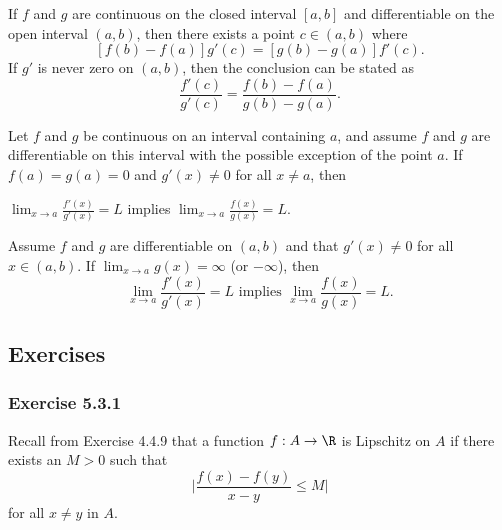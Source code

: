 \begin{tcolorbox}
    \begin{thm}
    If \( f  \) and \( g  \) are continuous on the closed interval \( [a,b]  \) and differentiable on the open interval \( (a,b)  \), then there exists a point \( c \in (a,b)  \) where 
    \[  [f(b) -f(a)]g'(c) = [g(b) -g(a)]f'(c). \]
    If \( g'  \) is never zero on \( (a,b)  \), then the conclusion can be stated as 
    \[  \frac{ f'(c)  }{ g'(c)  } = \frac{ f(b) - f(a)  }{ g(b) - g(a)  }. \]
    \end{thm}
\end{tcolorbox}

\begin{tcolorbox}
    \begin{thm}
    Let \( f  \) and \( g  \) be continuous on an interval containing \( a  \), and assume \( f  \) and \( g  \) are differentiable on this interval with the possible exception of the point \( a  \). If \( f(a) = g(a) = 0  \) and \( g'(x) \neq 0  \) for all \( x \neq a  \), then 
    \begin{center}
        \( \lim_{ x \to a } \frac{ f'(x)  }{ g'(x)  } = L  \) implies \( \lim_{ x \to a } \frac{ f(x)  }{ g(x)  } = L. \)
    \end{center}
    \end{thm}
\end{tcolorbox}

\begin{tcolorbox}
    \begin{thm}
    Assume \( f  \) and \( g  \) are differentiable on \( (a,b)  \) and that \( g'(x) \neq 0  \) for all \( x \in (a,b) \). If \( \lim_{ x \to a } g(x) = \infty  \) (or \( - \infty  \)), then 
    \[  \lim_{ x \to a } \frac{ f'(x)  }{ g'(x)  } = L \text{~implies~} \lim_{ x \to a } \frac{ f(x)  }{ g(x)  } = L. \]
    \end{thm}
\end{tcolorbox}


\subsection{Exercises}

\subsubsection{Exercise 5.3.1} Recall from Exercise 4.4.9 that a function \( f: A \to \R  \) is Lipschitz on \( A  \) if there exists an \( M > 0  \) such that 
\[  \Big| \frac{ f(x) - f(y)  }{ x - y  } \leq M  \Big|    \] for all \( x \neq y  \) in \( A  \).

